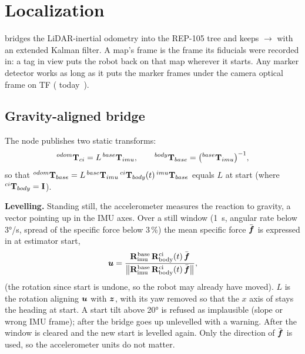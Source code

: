\chapter{Localization}
\label{ch:localization}

 bridges the LiDAR-inertial odometry into the REP-105 tree and keeps
$\to$ with an extended Kalman filter. A map's frame is the frame its fiducials
were recorded in: a tag in view puts the robot back on that map wherever it starts. Any marker
detector works as long as it puts the marker frames under the camera optical frame on TF
( today~\cite{olson2011apriltag,wang2016apriltag2}).

\section{Gravity-aligned bridge}
\label{sec:leveling}

The node publishes two static transforms:
\begin{equation}
  {}^{odom}\mathbf{T}_{ci} = L\, {}^{base}\mathbf{T}_{imu}, \qquad {}^{body}\mathbf{T}_{base} = \big({}^{base}\mathbf{T}_{imu}\big)^{-1},
\end{equation}
so that ${}^{odom}\mathbf{T}_{base} = L\, {}^{base}\mathbf{T}_{imu}\, {}^{ci}\mathbf{T}_{body}(t)\, {}^{imu}\mathbf{T}_{base}$ equals $L$ at start
(where ${}^{ci}\mathbf{T}_{body} = \mathbf{I}$).

\textbf{Levelling.} Standing still, the accelerometer measures the reaction to gravity, a vector
pointing up in the IMU axes. Over a still window (1~s, angular rate below 3°/s, spread of the
specific force below 3\,\%) the mean specific force $\bar{\boldsymbol{f}}$ is expressed in
 at estimator start,
\begin{equation}
  \boldsymbol{u} = \frac{\mathbf{R}^{\mathrm{base}}_{\mathrm{imu}}\, \mathbf{R}^{\mathrm{ci}}_{
  \mathrm{body}}(t)\, \bar{\boldsymbol{f}}}{\big\|\mathbf{R}^{\mathrm{base}}_{\mathrm{imu}}\,
  \mathbf{R}^{\mathrm{ci}}_{\mathrm{body}}(t)\, \bar{\boldsymbol{f}}\big\|},
\end{equation}
(the rotation since start is undone, so the robot may already have moved). $L$ is the rotation
aligning $\boldsymbol{u}$ with $\boldsymbol{z}$, with its yaw removed so that the $x$ axis of 
stays the heading at start. A start tilt above 20° is refused as implausible (slope or wrong IMU
frame); after  the bridge goes up unlevelled with a warning. After
 the window is cleared and the new start is levelled again. Only the
direction of $\bar{\boldsymbol{f}}$ is used, so the accelerometer units do not matter.


